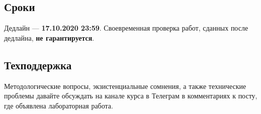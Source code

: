 \documentclass{report}
\begin{document}
\subsection{Сроки} 

Дедлайн — \textbf{17.10.2020 23:59}. Своевременная проверка работ, сданных
после дедлайна, \textbf{не гарантируется}. 

\subsection{Техподдержка}

Методологические вопросы, экзистенциальные сомнения, а также
технические проблемы давайте обсуждать на канале курса в Телеграм в
комментариях к посту, где объявлена лабораторная работа.
\end{document}
